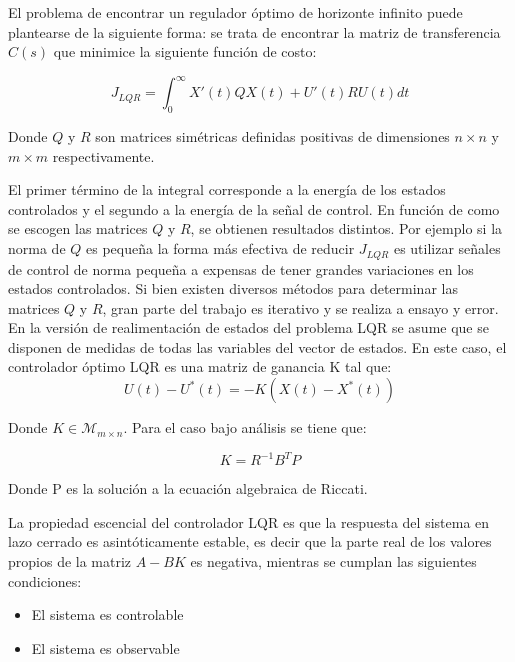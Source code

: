 \documentclass[main]{subfiles}
\begin{document}
El problema de encontrar un regulador \'optimo de horizonte infinito puede plantearse de la siguiente forma: se trata de encontrar la matriz de transferencia $C(s)$ que minimice la siguiente funci\'on de costo:

\begin{equation}
\label{eq:lqr}
J_{LQR} = \int_{0}^{\infty}  X'(t)Q X(t)+U'(t)RU(t)dt
\end{equation}

Donde $Q$ y $R$ son matrices sim\'etricas definidas positivas de dimensiones $n\times n$ y $m\times m$ respectivamente. 

El primer t\'ermino de la integral corresponde a la energ\'ia de los estados controlados y el segundo a la energ\'ia de la señal de control. En funci\'on de como se escogen las matrices $Q$ y $R$, se obtienen resultados distintos. Por ejemplo si la norma de $Q$ es pequeña la forma m\'as efectiva de reducir $J_{LQR}$ es utilizar señales de control de norma pequeña a expensas de tener grandes variaciones en los estados controlados. Si bien existen diversos m\'etodos para determinar las matrices $Q$ y $R$, gran parte del trabajo es iterativo y se realiza a ensayo y error.\\  

En la versi\'on de realimentaci\'on de estados del problema LQR se asume que se disponen de medidas de todas las variables del vector de estados. En este caso, el controlador \'optimo LQR es una matriz de ganancia K tal que:
\begin{equation}
U(t)-U^*(t) = -K(X(t)-X^*(t))
\end{equation}

Donde $K\in\mathcal{M}_{m\times n}$. Para el caso bajo an\'alisis se tiene que: 

\begin{equation}
K = R^{-1}B^TP
\end{equation}

Donde P es la soluci\'on a la ecuaci\'on algebraica de Riccati.

La propiedad escencial del controlador LQR es que la respuesta del sistema en lazo cerrado es asint\'oticamente estable, es decir que la parte real de los valores propios de la matriz $A-BK$ es negativa, mientras se cumplan las siguientes condiciones:

\begin{itemize}
\item El sistema es controlable
\item El sistema es observable
\end{itemize}
\end{document}
